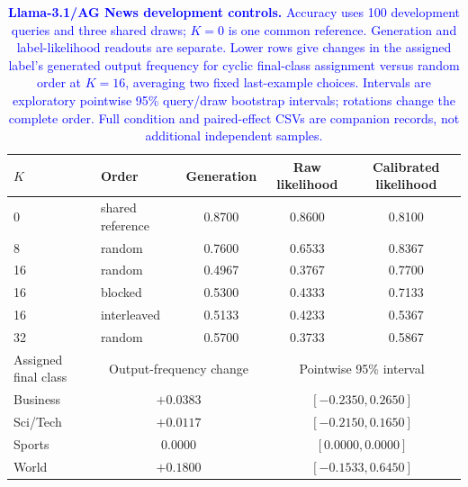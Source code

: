 \begin{table}[h]
\centering\color{blue}
\caption{\textcolor{blue}{\textbf{Llama-3.1/AG News development controls.} Accuracy uses 100 development queries and three shared draws; $K{=}0$ is one common reference. Generation and label-likelihood readouts are separate. Lower rows give changes in the assigned label's generated output frequency for cyclic final-class assignment versus random order at $K{=}16$, averaging two fixed last-example choices. Intervals are exploratory pointwise 95\% query/draw bootstrap intervals; rotations change the complete order. Full condition and paired-effect CSVs are companion records, not additional independent samples.}}
\label{stab:w3}
\footnotesize
\begin{tabular}{llccc}
\toprule
$K$ & Order & Generation & Raw likelihood & Calibrated likelihood \\
\midrule
0 & shared reference & 0.8700 & 0.8600 & 0.8100 \\
8 & random & 0.7600 & 0.6533 & 0.8367 \\
16 & random & 0.4967 & 0.3767 & 0.7700 \\
16 & blocked & 0.5300 & 0.4333 & 0.7133 \\
16 & interleaved & 0.5133 & 0.4233 & 0.5367 \\
32 & random & 0.5700 & 0.3733 & 0.5867 \\
\midrule
Assigned final class & \multicolumn{2}{c}{Output-frequency change} & \multicolumn{2}{c}{Pointwise 95\% interval} \\
Business & \multicolumn{2}{c}{$+0.0383$} & \multicolumn{2}{c}{$[-0.2350,0.2650]$} \\
Sci/Tech & \multicolumn{2}{c}{$+0.0117$} & \multicolumn{2}{c}{$[-0.2150,0.1650]$} \\
Sports & \multicolumn{2}{c}{$0.0000$} & \multicolumn{2}{c}{$[0.0000,0.0000]$} \\
World & \multicolumn{2}{c}{$+0.1800$} & \multicolumn{2}{c}{$[-0.1533,0.6450]$} \\
\bottomrule
\end{tabular}
\end{table}
